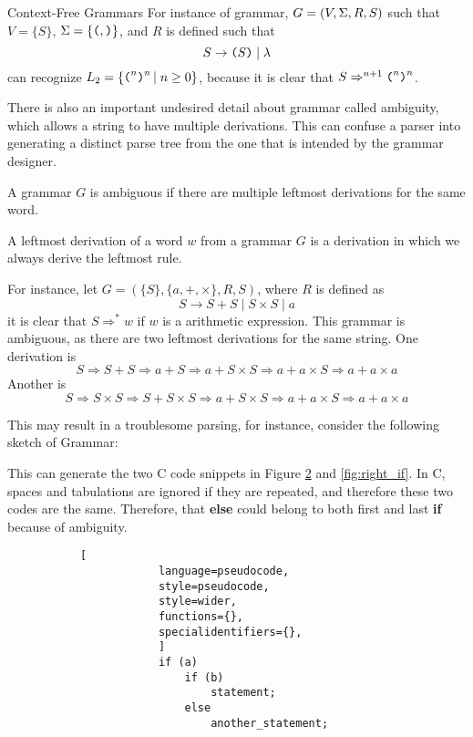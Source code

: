 \begin{section}{Context-Free Grammars}
For instance of grammar, $G = (V, \Sigma, R, S)$ such that
$V = \{S\}$, $\Sigma = \{\texttt{(}, \texttt{)}\}$, and $R$ is defined such that
$$S \rightarrow \texttt{(} S\texttt{)} \; | \; \lambda$$
can recognize $L_2 = \{\texttt{(}^n \texttt{)}^n\,|\;n \geq 0\}$, because it is clear that
$S \Rightarrow^{n+1} \texttt{(}^n\texttt{)}^n$.

There is also an important undesired detail about grammar called ambiguity, which
allows a string to have multiple derivations. This can confuse a parser into
generating a distinct parse tree from the one that is intended by the grammar
designer.

\begin{definition}
	A grammar $G$ is ambiguous if there are multiple leftmost derivations for the same
	word.
\end{definition}
\begin{definition}
	A leftmost derivation of a word $w$ from a grammar $G$ is a derivation
	in which we always derive the leftmost rule.
\end{definition}

For instance, let $G = (\{S\}, \{a, +, \times\}, R, S)$, where $R$ is defined
as
$$S \rightarrow S+S \; | \; S \times S \; | \; a $$
it is clear that $S \Rightarrow^* w$ if $w$ is a arithmetic expression. This
grammar is ambiguous, as there are two leftmost derivations for the same string.
One derivation is
$$ S \Rightarrow S + S \Rightarrow a + S \Rightarrow a + S \times S \Rightarrow a + a \times S \Rightarrow a + a \times a$$
Another is
$$ S \Rightarrow S \times S \Rightarrow S + S \times S \Rightarrow a + S \times S \Rightarrow a + a \times S \Rightarrow a + a \times a$$

This may result in a troublesome parsing, for instance, consider the
following sketch of Grammar:



This can generate the two C code snippets in Figure \ref{fig:left_if} and
\ref{fig:right_if}. In C, spaces and tabulations are ignored if they are
repeated, and therefore these two codes are the same. Therefore, that
\textbf{else} could belong to both first and last \textbf{if} because of
ambiguity. 

\begin{figure}[ht]
    \centering
    \begin{subfigure}[b]{0.40\textwidth}

		\begin{lstlisting}[
			language=pseudocode,
			style=pseudocode,
			style=wider,
			functions={},
			specialidentifiers={},
			]
			if (a)
				if (b)
					statement;
				else
					another_statement;
		\end{lstlisting}
        \caption{\label{fig:left_if}}


\end{subfigure}
\end{figure}
\end{section}
